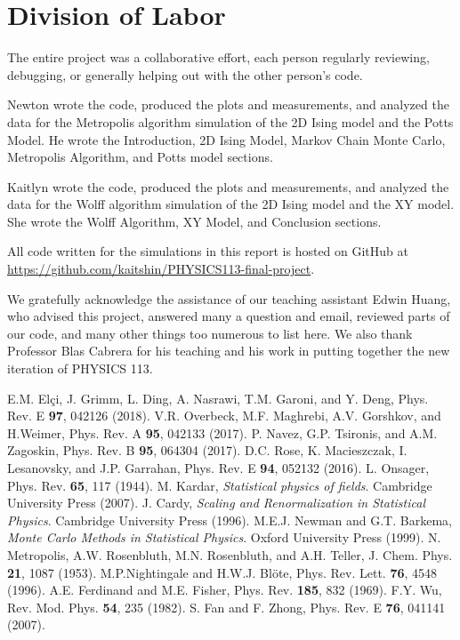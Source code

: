 \documentclass[twocolumn,aps]{revtex4-1} %
\begin{document}
\section{Division of Labor}
The entire project was a collaborative effort, each person regularly reviewing, debugging, or generally helping out with the other person's code.

Newton wrote the code, produced the plots and measurements, and analyzed the data for the Metropolis algorithm simulation of the 2D Ising model and the Potts Model. He wrote the Introduction, 2D Ising Model, Markov Chain Monte Carlo, Metropolis Algorithm, and Potts model sections.

Kaitlyn wrote the code, produced the plots and measurements, and analyzed the data for the Wolff algorithm simulation of the 2D Ising model and the XY model. She wrote the Wolff Algorithm, XY Model, and Conclusion sections. 

All code written for the simulations in this report is hosted on GitHub at \url{https://github.com/kaitshin/PHYSICS113-final-project}.




\begin{acknowledgements}
We gratefully acknowledge the assistance of our teaching assistant Edwin Huang, who advised this project, answered many a question and email, reviewed parts of our code, and many other things too numerous to list here. We also thank Professor Blas Cabrera for his teaching and his work in putting together the new iteration of PHYSICS 113.
\end{acknowledgements}


\begin{thebibliography}{99}
	 E.M. Elçi, J. Grimm, L. Ding, A. Nasrawi, T.M. Garoni, and Y. Deng, Phys. Rev. E \textbf{97}, 042126 (2018).
	 V.R. Overbeck, M.F. Maghrebi, A.V. Gorshkov, and H.Weimer, Phys. Rev. A \textbf{95}, 042133 (2017).
	 P. Navez, G.P. Tsironis, and A.M. Zagoskin, Phys. Rev. B \textbf{95}, 064304 (2017).
	 D.C. Rose, K. Macieszczak, I. Lesanovsky, and J.P. Garrahan, Phys. Rev. E \textbf{94}, 052132 (2016).
	 L. Onsager, Phys. Rev. \textbf{65}, 117 (1944).
	 M. Kardar, \textit{Statistical physics of fields}. Cambridge University Press (2007).
	 J. Cardy, \textit{Scaling and Renormalization in Statistical Physics}. Cambridge University Press (1996).
	 M.E.J. Newman and G.T. Barkema, \textit{Monte Carlo Methods in Statistical Physics}. Oxford University Press (1999).
	 N. Metropolis, A.W. Rosenbluth, M.N. Rosenbluth, and A.H. Teller, J. Chem. Phys. \textbf{21}, 1087 (1953).
	 M.P.Nightingale and H.W.J. Blöte, Phys. Rev. Lett. \textbf{76}, 4548 (1996).
	 A.E. Ferdinand and M.E. Fisher, Phys. Rev. \textbf{185}, 832 (1969).
	 F.Y. Wu, Rev. Mod. Phys. \textbf{54}, 235 (1982).
	 S. Fan and F. Zhong, Phys. Rev. E \textbf{76}, 041141 (2007).
\end{thebibliography}
\end{document}
